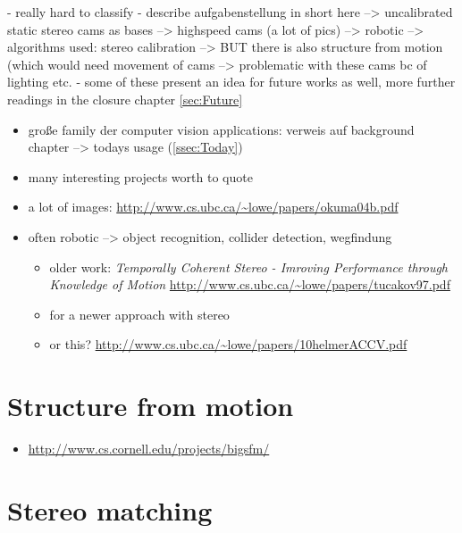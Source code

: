- really hard to classify
- describe aufgabenstellung in short here --> uncalibrated  static stereo cams as bases --> highspeed cams (a lot of pics) --> robotic --> algorithms used: stereo calibration --> BUT there is also structure from motion (which would need movement of cams --> problematic with these cams bc of lighting etc. 
- some of these present an idea for future works as well, more further readings in the closure chapter \autoref{sec:Future}
\begin{itemize}
\item große family der computer vision applications: verweis auf background chapter --> todays usage (\autoref{ssec:Today})
\item many interesting projects worth to quote
\item a lot of images: \cite{Okuma.2004} \url{http://www.cs.ubc.ca/~lowe/papers/okuma04b.pdf}
\item often robotic --> object recognition, collider detection, wegfindung
	\begin{itemize}
	\item older work: \textit{Temporally Coherent Stereo - Imroving Performance through Knowledge of Motion} 	\cite{Tucakov.1997} \url{http://www.cs.ubc.ca/~lowe/papers/tucakov97.pdf}
	\item \cite{Helmer.2010} for a newer approach with stereo
	\item or this? \url{http://www.cs.ubc.ca/~lowe/papers/10helmerACCV.pdf}
	\end{itemize}
\end{itemize}

\section{Structure from motion}

\begin{itemize}
\item \url{http://www.cs.cornell.edu/projects/bigsfm/} 
\end{itemize}

\section{Stereo matching}


